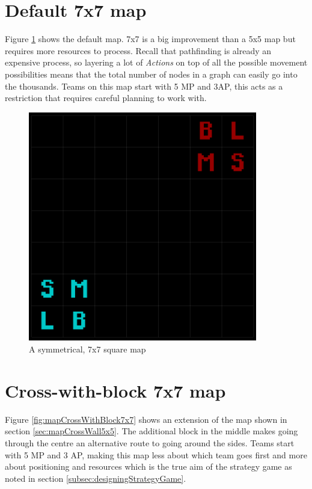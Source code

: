 \documentclass[11pt, a4paper]{report}
\begin{document}
\begin{appendices}
\pagebreak
\section{Default 7x7 map}
\label{sec:mapDefault7x7}

Figure \ref{fig:mapDefault7x7} shows the default map. 7x7 is a big improvement than a 5x5 map but requires more resources to process. Recall that pathfinding is already an expensive process, so layering a lot of \emph{Actions} on top of all the possible movement possibilities means that the total number of nodes in a graph can easily go into the thousands. Teams on this map start with 5 MP and 3AP, this acts as a restriction that requires careful planning to work with.

\begin{figure}[!h]
  \centering
  \includegraphics[width=10cm]{img/map_default_7x7.png}
  \caption{A symmetrical, 7x7 square map}
  \label{fig:mapDefault7x7}
\end{figure}

\pagebreak
\section{Cross-with-block 7x7 map}
\label{sec:mapCrossWithBlock7x7}

Figure \ref{fig:mapCrossWithBlock7x7} shows an extension of the map shown in section \ref{sec:mapCrossWall5x5}. The additional block in the middle makes going through the centre an alternative route to going around the sides. Teams start with 5 MP and 3 AP, making this map less about which team goes first and more about positioning and resources which is the true aim of the strategy game as noted in section \ref{subsec:designingStrategyGame}.


\end{appendices}
\end{document}
